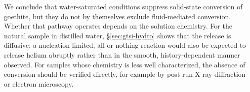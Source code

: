 We conclude that water-saturated conditions suppress solid-state conversion of goethite, but
they do not by themselves exclude fluid-mediated conversion. Whether that pathway operates
depends on the solution chemistry. For the natural sample in distilled water,
\S\ref{sec:gtsi-hydro} shows that the release is diffusive; a nucleation-limited, all-or-nothing
reaction would also be expected to release helium abruptly rather than in the smooth,
history-dependent manner observed. For samples whose chemistry is less well characterized, the
absence of conversion should be verified directly, for example by post-run X-ray diffraction or
electron microscopy.
